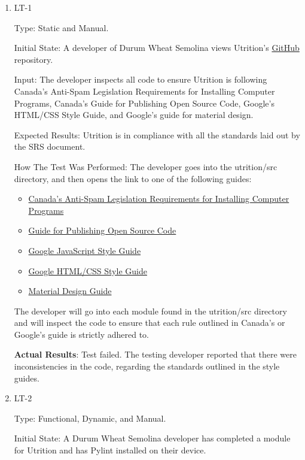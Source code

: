 \documentclass[12pt, titlepage]{article}
\begin{document}
	\begin{enumerate}
		\item{LT-1}
		
		Type: Static and Manual.
		
		Initial State: A developer of Durum Wheat Semolina views Utrition’s \href{https://github.com/jeff-rey-wang/utrition/}{GitHub} repository.
		
		Input: The developer inspects all code to ensure Utrition is following Canada’s Anti-Spam Legislation Requirements for Installing Computer Programs, Canada’s Guide for Publishing Open Source Code, Google’s HTML/CSS Style Guide, and Google’s guide for material design.
		
		Expected Results: Utrition is in compliance with all the standards laid out by the SRS document.
		
		How The Test Was Performed: The developer goes into the utrition/src directory, and then opens the link to one of the following guides:
		\begin{itemize}
			\item \href{https://crtc.gc.ca/eng/internet/install.htm}{Canada’s Anti-Spam Legislation Requirements for Installing Computer Programs}
			\item \href{https://www.canada.ca/en/government/system/digital-government/digital-government-innovations/open-source-software/guide-for-publishing-open-source-code.html}{Guide for Publishing Open Source Code}
			\item \href{https://google.github.io/styleguide/jsguide.html}{Google JavaScript Style Guide}
			\item \href{https://google.github.io/styleguide/htmlcssguide.html}{Google HTML/CSS Style Guide}
			\item \href{https://material.io/design}{Material Design Guide}
		\end{itemize}
		The developer will go into each module found in the utrition/src directory and will inspect the code to ensure that each rule outlined in Canada’s or Google’s guide is strictly adhered to.
		
		\textbf{Actual Results}: Test failed. The testing developer reported that there were inconsistencies in the code, regarding the standards outlined in the style guides.
		
		\item{LT-2}
		
		Type: Functional, Dynamic, and Manual.
		
		Initial State: A Durum Wheat Semolina developer has completed a module for Utrition and has Pylint installed on their device.
		

\end{enumerate}
\end{document}
